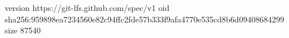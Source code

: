 version https://git-lfs.github.com/spec/v1
oid sha256:959898ea7234560e82c94ffc2fde57b333f9afa4770e535cd8b6d09408684299
size 87540
